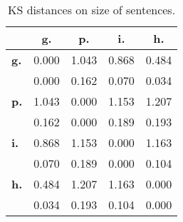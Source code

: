 \begin{table}[h!]
\begin{center}
\begin{tabular}{| l || c | c | c | c |}\hline
 & {\bf g.} & {\bf p.} & {\bf i.} & {\bf h.} \\\hline\hline
{\bf g.} & 0.000 & 1.043 & 0.868 & 0.484 \\
{\bf } & 0.000 & 0.162 & 0.070 & 0.034 \\\hline
{\bf p.} & 1.043 & 0.000 & 1.153 & 1.207 \\
{\bf } & 0.162 & 0.000 & 0.189 & 0.193 \\\hline
{\bf i.} & 0.868 & 1.153 & 0.000 & 1.163 \\
{\bf } & 0.070 & 0.189 & 0.000 & 0.104 \\\hline
{\bf h.} & 0.484 & 1.207 & 1.163 & 0.000 \\
{\bf } & 0.034 & 0.193 & 0.104 & 0.000 \\\hline
\end{tabular}
\caption{KS distances on size of sentences.}
\end{center}
\end{table}